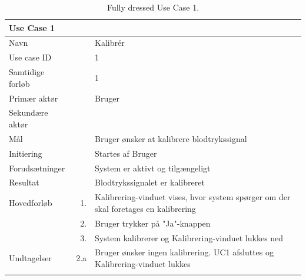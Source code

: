 \begin{longtabu} to  %
    {\large \textbf{Use Case 1}} && \\
    \toprule
    Navn &&    Kalibrér\\
    Use case ID &&    1\\
    Samtidige forløb &&    1\\
    Primær aktør &&    Bruger\\
    Sekundære aktør &&	 \\
    Mål &&    Bruger ønsker at kalibrere blodtrykssignal\\
    Initiering &&	Startes af Bruger\\
    Forudsætninger &&  System er aktivt og tilgængeligt\\
    Resultat &&		Blodtrykssignalet er kalibreret                         \\ \midrule
    Hovedforløb &    1. &	 Kalibrering-vinduet vises, hvor system spørger om der skal foretages en kalibrering\\[-1ex]  				
    			&    2. &    Bruger trykker på "Ja"\--knappen\\
                &    3.	&	 System kalibrerer og Kalibrering-vinduet lukkes ned \newline\\ \midrule
                
    Undtagelser &    2.a &   Bruger ønsker ingen kalibrering. UC1 afsluttes og Kalibrering-vinduet lukkes  \\ \bottomrule
\caption{Fully dressed Use Case 1.}
\label{UC1}
\end{longtabu}


